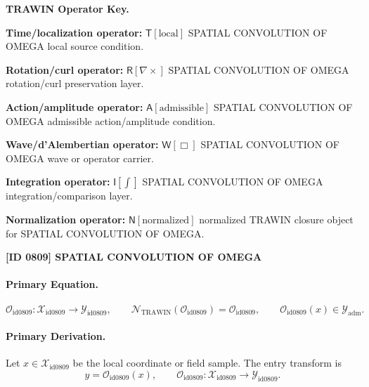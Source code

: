 \par\vspace{0.45\baselineskip}
\noindent\begin{minipage}[t]{\linewidth}
\begingroup
\small
\raggedright
\textbf{TRAWIN Operator Key.}\par
\noindent\textbf{Time/localization operator:} $\mathsf{T}\!\left[\mathrm{local}\right]$ SPATIAL CONVOLUTION OF OMEGA local source condition.\par
\noindent\textbf{Rotation/curl operator:} $\mathsf{R}\!\left[\nabla\times\right]$ SPATIAL CONVOLUTION OF OMEGA rotation/curl preservation layer.\par
\noindent\textbf{Action/amplitude operator:} $\mathsf{A}\!\left[\mathrm{admissible}\right]$ SPATIAL CONVOLUTION OF OMEGA admissible action/amplitude condition.\par
\noindent\textbf{Wave/d'Alembertian operator:} $\mathsf{W}\!\left[\Box\right]$ SPATIAL CONVOLUTION OF OMEGA wave or operator carrier.\par
\noindent\textbf{Integration operator:} $\mathsf{I}\!\left[\int\right]$ SPATIAL CONVOLUTION OF OMEGA integration/comparison layer.\par
\noindent\textbf{Normalization operator:} $\mathsf{N}\!\left[\mathrm{normalized}\right]$ normalized TRAWIN closure object for SPATIAL CONVOLUTION OF OMEGA.\par
\endgroup
\end{minipage}

\clearpage
\noindent\textbf{[ID 0809] SPATIAL CONVOLUTION OF OMEGA}\par
\vspace{0.35em}
\paragraph{Primary Equation.}
\[
\mathcal{O}_{\mathrm{id0809}}:\mathcal{X}_{\mathrm{id0809}}\longrightarrow \mathcal{Y}_{\mathrm{id0809}},\qquad
\mathcal{N}_{\mathrm{TRAWIN}}(\mathcal{O}_{\mathrm{id0809}})=\mathcal{O}_{\mathrm{id0809}},\qquad
\mathcal{O}_{\mathrm{id0809}}(x)\in\mathcal{Y}_{\mathrm{adm}}.
\]

\paragraph{Primary Derivation.} Let $x\in \mathcal{X}_{\mathrm{id0809}}$ be the local coordinate or field sample.  The entry transform is\[
y=\mathcal{O}_{\mathrm{id0809}}(x),\qquad \mathcal{O}_{\mathrm{id0809}}:\mathcal{X}_{\mathrm{id0809}}\longrightarrow \mathcal{Y}_{\mathrm{id0809}}.
\]


